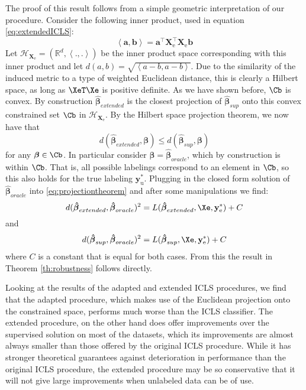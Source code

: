 The proof of this result follows from a simple geometric interpretation of our procedure. Consider the following inner product, used in equation \eqref{eq:extendedICLS}:
\begin{equation}
\left\langle \mathbf{a}, \mathbf{b} \right\rangle = \mathbf{a}^\top \mathbf{X}_\text{e}^\top \mathbf{X}_\text{e} \mathbf{b}
\end{equation}
Let $\mathcal{H}_{\mathbf{X}_\text{e}} = ( \mathbb{R}^d,\left\langle ., . \right\rangle )$ be the inner product space corresponding with this inner product and let $d(a,b)=\sqrt{\left\langle a-b, a-b \right\rangle}$. Due to the similarity of the induced metric to a type of weighted Euclidean distance, this is clearly a Hilbert space, as long as $\XeT \Xe$ is positive definite. As we have shown before, $\Cb$ is convex. By construction $\boldsymbol{\hat{\beta}}_{extended}$ is the closest projection of $\boldsymbol{\hat{\beta}}_{sup}$ onto this convex constrained set $\Cb$ in $\mathcal{H}_{\mathbf{X}_\text{e}}$. By the Hilbert space projection theorem, we now have that 
\begin{equation}
\label{eq:projectiontheorem}
d(\boldsymbol{\hat{\beta}}_{extended},\boldsymbol{\beta}) \leq d(\boldsymbol{\hat{\beta}}_{sup},\boldsymbol{\beta})
\end{equation}
for any $\boldsymbol{\beta} \in \Cb$. In particular consider $\boldsymbol{\beta}=\boldsymbol{\hat{\beta}}_{oracle}$, which by construction is within $\Cb$. That is, all possible labelings correspond to an element in $\Cb$, so this also holds for the true labeling $\mathbf{y}_\text{u}^\ast$. Plugging in the closed form solution of $\boldsymbol{\hat{\beta}}_{oracle}$ into \eqref{eq:projectiontheorem} and after some manipulations we find:
\begin{equation}
d(\boldsymbol{\hat{\beta}}_{extended},\boldsymbol{\hat{\beta}}_{oracle})^2=L(\boldsymbol{\hat{\beta}}_{extended},\Xe,\mathbf{y}_\text{e}^{\ast})+C \\ \nonumber
\end{equation}
and
\begin{equation}
d(\boldsymbol{\hat{\beta}}_{sup},\boldsymbol{\hat{\beta}}_{oracle})^2=L(\boldsymbol{\hat{\beta}}_{sup},\Xe,\mathbf{y}_\text{e}^{\ast})+C \nonumber
\end{equation} 
where $C$ is a constant that is equal for both cases. From this the result in Theorem \ref{th:robustness} follows directly.



Looking at the results of the adapted and extended ICLS procedures, we find that the adapted procedure, which makes use of the Euclidean projection onto the constrained space, performs much worse than the ICLS classifier. The extended procedure, on the other hand does offer improvements over the supervised solution on most of the datasets, which its improvements are almost always smaller than those offered by the original ICLS procedure. While it has stronger theoretical guarantees against deterioration in performance than the original ICLS procedure, the extended procedure may be so conservative that it will not give large improvements when unlabeled data can be of use.

